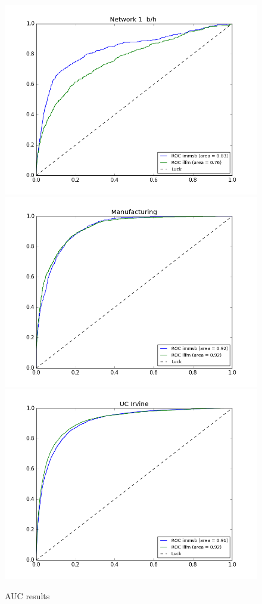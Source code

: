 \begin{figure}[h]
	\endminipage
	\includegraphics[scale=0.22]{img/M_e/AUC-ROC/figure_4}
	\endminipage
		\vspace{-0.4cm}
	\includegraphics[scale=0.22]{img/M_e/AUC-ROC/figure_5}
	\endminipage
	\includegraphics[scale=0.22]{img/M_e/AUC-ROC/figure_6}
	\endminipage
	
	\caption{AUC results}
	\label{fig:auc}
\end{figure}



